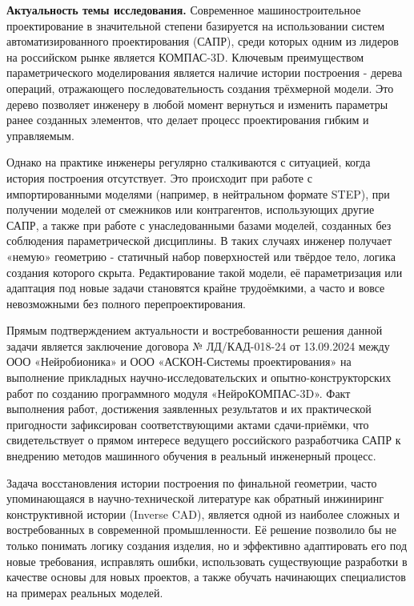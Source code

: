 

\textbf{Актуальность темы исследования.} Современное машиностроительное проектирование в значительной степени базируется на использовании систем автоматизированного проектирования (САПР), среди которых одним из лидеров на российском рынке является КОМПАС-3D. Ключевым преимуществом параметрического моделирования является наличие истории построения - дерева операций, отражающего последовательность создания трёхмерной модели. Это дерево позволяет инженеру в любой момент вернуться и изменить параметры ранее созданных элементов, что делает процесс проектирования гибким и управляемым.

Однако на практике инженеры регулярно сталкиваются с ситуацией, когда история построения отсутствует. Это происходит при работе с импортированными моделями (например, в нейтральном формате STEP), при получении моделей от смежников или контрагентов, использующих другие САПР, а также при работе с унаследованными базами моделей, созданных без соблюдения параметрической дисциплины. В таких случаях инженер получает «немую» геометрию - статичный набор поверхностей или твёрдое тело, логика создания которого скрыта. Редактирование такой модели, её параметризация или адаптация под новые задачи становятся крайне трудоёмкими, а часто и вовсе невозможными без полного перепроектирования.

Прямым подтверждением актуальности и востребованности решения данной задачи является заключение договора № ЛД/КАД-018-24 от 13.09.2024 между ООО «Нейробионика» и ООО «АСКОН-Системы проектирования» на выполнение прикладных научно-исследовательских и опытно-конструкторских работ по созданию программного модуля «НейроКОМПАС-3D». Факт выполнения работ, достижения заявленных результатов и их практической пригодности зафиксирован соответствующими актами сдачи-приёмки, что свидетельствует о прямом интересе ведущего российского разработчика САПР к внедрению методов машинного обучения в реальный инженерный процесс.

Задача восстановления истории построения по финальной геометрии, часто упоминающаяся в научно-технической литературе как обратный инжиниринг конструктивной истории (Inverse CAD), является одной из наиболее сложных и востребованных в современной промышленности. Её решение позволило бы не только понимать логику создания изделия, но и эффективно адаптировать его под новые требования, исправлять ошибки, использовать существующие разработки в качестве основы для новых проектов, а также обучать начинающих специалистов на примерах реальных моделей.

